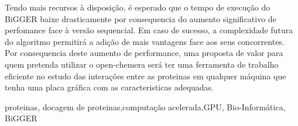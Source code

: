  Tendo mais recursos à disposição, é esperado que o tempo de execução do BiGGER baixe drasticamente por consequencia do aumento significativo de perfomance face à versão sequencial.
Em caso de sucesso, a complexidade futura do algoritmo permitirá a adição de mais vantagens face aos seus concorrentes.
Por consequencia deste aumento de performance, uma proposta de valor para quem pretenda utilizar o open-chemera será ter uma ferramenta de trabalho eficiente no estudo das interações entre as proteinas em qualquer máquina que tenha uma placa gráfica com as caracteristicas adequadas.
%
%
%


\begin{keywords}
proteinas, docagem de proteinas,computação acelerada,GPU, Bio-Informática, BiGGER
\end{keywords}
